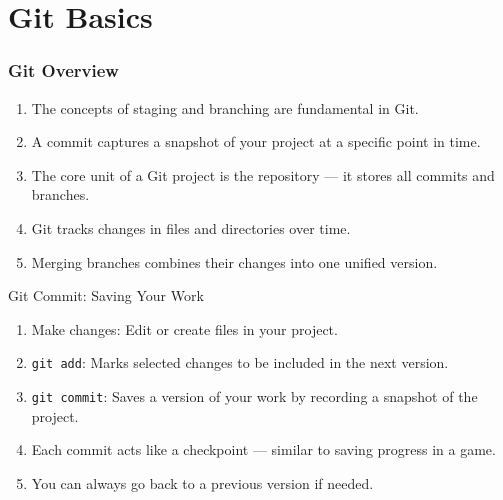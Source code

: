 \documentclass[12pt]{beamer}
\begin{document}
\section{Git Basics}

\begin{frame}
  \frametitle{Git Overview}
  \begin{enumerate}
    \setlength\itemsep{1em}
    \item The concepts of staging and branching are fundamental in Git.
    \item A commit captures a snapshot of your project at a specific point in time.
    \item The core unit of a Git project is the repository — it stores all commits and branches.
    \item Git tracks changes in files and directories over time.
    \item Merging branches combines their changes into one unified version.
  \end{enumerate}
\end{frame}

\begin{frame}{Git Commit: Saving Your Work}
  \begin{enumerate}
    \setlength\itemsep{1em}
    \item Make changes: Edit or create files in your project.
    \item \texttt{git add}: Marks selected changes to be included in the next version.
    \item \texttt{git commit}: Saves a version of your work by recording a snapshot of the project.
    \item Each commit acts like a checkpoint — similar to saving progress in a game.
    \item You can always go back to a previous version if needed.
  \end{enumerate}
\end{frame}
\end{document}
